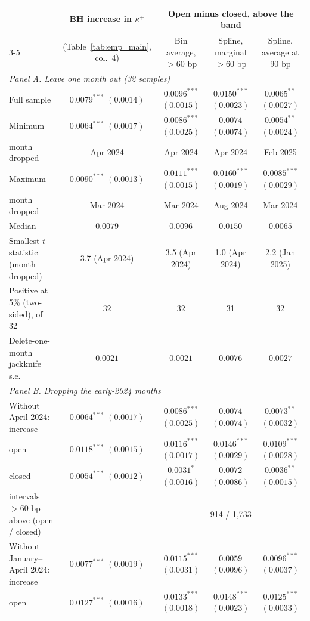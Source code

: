 \begin{tabular}{lcccc}
\toprule
 & BH increase in $\kappa^+$ & \multicolumn{3}{c}{Open minus closed, above the band} \\
\cmidrule(lr){3-5}
 & (Table~\ref{tab:emp_main}, col.\ 4) & Bin average, $>60$ bp & Spline, marginal $>60$ bp & Spline, average at 90 bp \\
\midrule
\multicolumn{5}{l}{\emph{Panel A. Leave one month out (32 samples)}} \\
Full sample & $0.0079^{***}$ $(0.0014)$ & $0.0096^{***}$ $(0.0015)$ & $0.0150^{***}$ $(0.0023)$ & $0.0065^{**}$ $(0.0027)$ \\
Minimum & $0.0064^{***}$ $(0.0017)$ & $0.0086^{***}$ $(0.0025)$ & $0.0074$ $(0.0074)$ & $0.0054^{**}$ $(0.0024)$ \\
\quad month dropped & Apr 2024 & Apr 2024 & Apr 2024 & Feb 2025 \\
Maximum & $0.0090^{***}$ $(0.0013)$ & $0.0111^{***}$ $(0.0015)$ & $0.0160^{***}$ $(0.0019)$ & $0.0085^{***}$ $(0.0029)$ \\
\quad month dropped & Mar 2024 & Mar 2024 & Aug 2024 & Mar 2024 \\
Median & $0.0079$ & $0.0096$ & $0.0150$ & $0.0065$ \\
Smallest $t$-statistic (month dropped) & 3.7 (Apr 2024) & 3.5 (Apr 2024) & 1.0 (Apr 2024) & 2.2 (Jan 2025) \\
Positive at 5\% (two-sided), of 32 & 32 & 32 & 31 & 32 \\
Delete-one-month jackknife s.e. & $0.0021$ & $0.0021$ & $0.0076$ & $0.0027$ \\
\midrule
\multicolumn{5}{l}{\emph{Panel B. Dropping the early-2024 months}} \\
Without April 2024: increase & $0.0064^{***}$ $(0.0017)$ & $0.0086^{***}$ $(0.0025)$ & $0.0074$ $(0.0074)$ & $0.0073^{**}$ $(0.0032)$ \\
\quad open & $0.0118^{***}$ $(0.0015)$ & $0.0116^{***}$ $(0.0017)$ & $0.0146^{***}$ $(0.0029)$ & $0.0109^{***}$ $(0.0028)$ \\
\quad closed & $0.0054^{***}$ $(0.0012)$ & $0.0031^{*}$ $(0.0016)$ & $0.0072$ $(0.0086)$ & $0.0036^{**}$ $(0.0015)$ \\
\quad intervals $>60$ bp above (open / closed) & & \multicolumn{3}{c}{914 / 1,733} \\
Without January--April 2024: increase & $0.0077^{***}$ $(0.0019)$ & $0.0115^{***}$ $(0.0031)$ & $0.0059$ $(0.0096)$ & $0.0096^{***}$ $(0.0037)$ \\
\quad open & $0.0127^{***}$ $(0.0016)$ & $0.0133^{***}$ $(0.0018)$ & $0.0148^{***}$ $(0.0023)$ & $0.0125^{***}$ $(0.0033)$ \\

\end{tabular}
